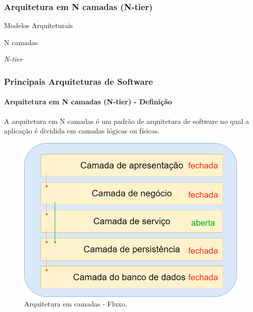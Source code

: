 \documentclass[
	10pt, %
	t, %
]{beamer}
\begin{document}
\subsubsection{Arquitetura em N camadas (N-tier)}

\begin{frame}
	\begin{center}
		
		\bigskip\bigskip\bigskip\bigskip %
		{\Large Modelos Arquiteturais}
		
		\bigskip\bigskip %
		{\Huge N camadas}

		\smallskip
		{\small \textit{N-tier}}
	\end{center}

\end{frame}

\begin{frame}
	\frametitle{Principais Arquiteturas de Software}
	\framesubtitle{Arquitetura em N camadas (N-tier) - Definição}

	A arquitetura em N camadas é um padrão de arquitetura de software no qual a aplicação é dividida em camadas lógicas ou físicas.

	\begin{figure}
		\centering
		\includegraphics[width=0.6\linewidth]{Images/n-tier-simple-2.png}
		\caption{Arquitetura em camadas - Fluxo.}\label{fig:n-tier-simple-2}
	\end{figure}

\end{frame}
\end{document}
